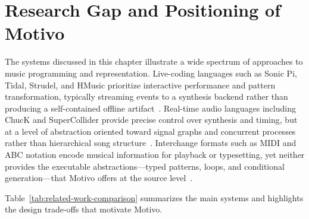 \section{Research Gap and Positioning of Motivo}\label{sec:motivo-position}

The systems discussed in this chapter illustrate a wide spectrum of approaches to music programming and representation.
Live-coding languages such as Sonic Pi, Tidal, Strudel, and HMusic prioritize interactive performance and pattern
transformation, typically streaming events to a synthesis backend rather than producing a self-contained offline
artifact~\cite{Aaron_2016,McLean_Wiggins_2010,Roos_McLean_2023,Du_Bois_Ribeiro_2019}.
Real-time audio languages including ChucK and SuperCollider provide precise control over synthesis and timing, but at a
level of abstraction oriented toward signal graphs and concurrent processes rather than hierarchical song
structure~\cite{Wang_Cook_2003,McCartney_2002}.
Interchange formats such as MIDI and ABC notation encode musical information for playback or typesetting, yet neither
provides the executable abstractions---typed patterns, loops, and conditional generation---that Motivo offers at the
source level~\cite{Moog_1986,Walshaw_2011,Moore_1988}.

Table~\ref{tab:related-work-comparison} summarizes the main systems and highlights the design trade-offs that motivate
Motivo.

